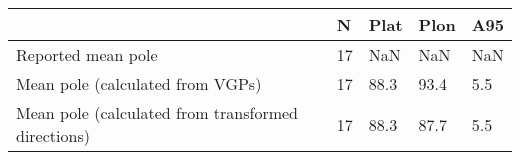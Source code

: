 \begin{tabular}{lllll}
\toprule
{} &   N &  Plat &  Plon &  A95 \\
\midrule
Reported mean pole                                 &  17 &   NaN &   NaN &  NaN \\
Mean pole (calculated from VGPs)                   &  17 &  88.3 &  93.4 &  5.5 \\
Mean pole (calculated from transformed directions) &  17 &  88.3 &  87.7 &  5.5 \\
\bottomrule
\end{tabular}
